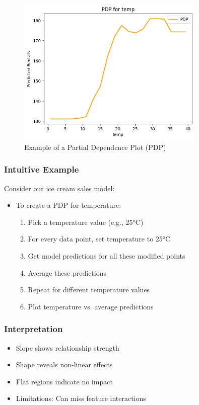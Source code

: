 \documentclass{article}
\begin{document}
\begin{figure}[h]
    \centering
    \includegraphics[width=0.8\textwidth]{images/pdp.png}
    \caption{Example of a Partial Dependence Plot (PDP)}
    \label{fig:pdp}
\end{figure}

\subsubsection{Intuitive Example}
Consider our ice cream sales model:
\begin{itemize}
    \item To create a PDP for temperature:
    \begin{enumerate}
        \item Pick a temperature value (e.g., 25°C)
        \item For every data point, set temperature to 25°C
        \item Get model predictions for all these modified points
        \item Average these predictions
        \item Repeat for different temperature values
        \item Plot temperature vs. average predictions
    \end{enumerate}
\end{itemize}

\subsubsection{Interpretation}
\begin{itemize}
    \item Slope shows relationship strength
    \item Shape reveals non-linear effects
    \item Flat regions indicate no impact
    \item Limitations: Can miss feature interactions
\end{itemize}
\end{document}
